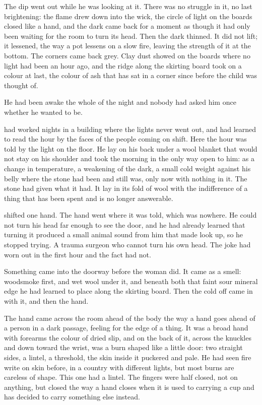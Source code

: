 The dip went out while he was looking at it. There was no struggle in it, no last brightening: the flame drew down into the wick, the circle of light on the boards closed like a hand, and the dark came back for a moment as though it had only been waiting for the room to turn its head. Then the dark thinned. It did not lift; it lessened, the way a pot lessens on a slow fire, leaving the strength of it at the bottom. The corners came back grey. Clay dust showed on the boards where no light had been an hour ago, and the ridge along the skirting board took on a colour at last, the colour of ash that has sat in a corner since before the child was thought of.

He had been awake the whole of the night and nobody had asked him once whether he wanted to be.

 had worked nights in a building where the lights never went out, and had learned to read the hour by the faces of the people coming on shift. Here the hour was told by the light on the floor. He lay on his back under a wool blanket that would not stay on his shoulder and took the morning in the only way open to him: as a change in temperature, a weakening of the dark, a small cold weight against his belly where the stone had been and still was, only now with nothing in it. The stone had given what it had. It lay in its fold of wool with the indifference of a thing that has been spent and is no longer answerable.

 shifted one hand. The hand went where it was told, which was nowhere. He could not turn his head far enough to see the door, and he had already learned that turning it produced a small animal sound from him that made  look up, so he stopped trying. A trauma surgeon who cannot turn his own head. The joke had worn out in the first hour and the fact had not.

Something came into the doorway before the woman did. It came as a smell: woodsmoke first, and wet wool under it, and beneath both that faint sour mineral edge he had learned to place along the skirting board. Then the cold off  came in with it, and then the hand.

The hand came across the room ahead of the body the way a hand goes ahead of a person in a dark passage, feeling for the edge of a thing. It was a broad hand with forearms the colour of dried slip, and on the back of it, across the knuckles and down toward the wrist, was a burn shaped like a little door: two straight sides, a lintel, a threshold, the skin inside it puckered and pale. He had seen fire write on skin before, in a country with different lights, but most burns are careless of shape. This one had a lintel. The fingers were half closed, not on anything, but closed the way a hand closes when it is used to carrying a cup and has decided to carry something else instead.

